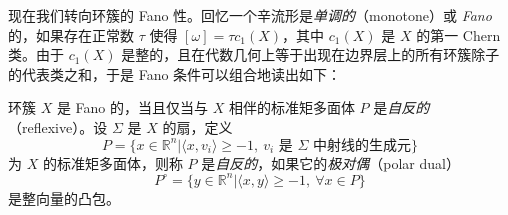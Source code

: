 现在我们转向环簇的 Fano 性。回忆一个辛流形是\emph{单调的}（monotone）或 \emph{Fano} 的，如果存在正常数 $\tau$ 使得 $[\omega]=\tau c_1 (X)$，其中 $c_1 (X)$ 是 $X$ 的第一 Chern 类。由于 $c_1 (X)$ 是整的，且在代数几何上等于出现在边界层上的所有环簇除子的代表类之和，于是 Fano 条件可以组合地读出如下：

\begin{definition*}
环簇 $X$ 是 Fano 的，当且仅当与 $X$ 相伴的标准矩多面体 $P$ 是\emph{自反的}（reflexive）。设 $\Sigma$ 是 $X$ 的扇，定义
\[
  P=\{x\in\mathbb{R}^n\vert \langle x,v_i\rangle\geq -1,\ v_i\text{ 是 }\Sigma\text{ 中射线的生成元}\}
\]
为 $X$ 的标准矩多面体，则称 $P$ 是\emph{自反的}，如果它的\emph{极对偶}（polar dual）
\[
  P^{\circ}=\{y\in\mathbb{R}^n\vert \langle x,y\rangle\geq -1,\ \forall x\in P\}
\]
是整向量的凸包。
\end{definition*}

